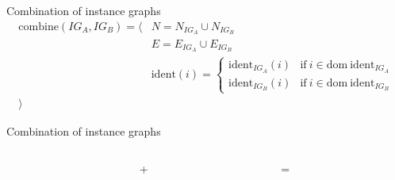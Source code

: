 \begin{frame}{Combination of instance graphs}
\begin{align*}
\mathrm{combine}(IG_A, IG_B) = \langle&
N = N_{IG_A} \cup N_{IG_B} \\&
E = E_{IG_A} \cup E_{IG_B} \\&
\mathrm{ident}(i) =
    \begin{cases}
        \mathrm{ident}_{IG_A}(i) & \mathrm{if }\ i \in \mathrm{dom}\ \mathrm{ident}_{IG_A} \\
        \mathrm{ident}_{IG_B}(i) & \mathrm{if }\ i \in \mathrm{dom}\ \mathrm{ident}_{IG_B} 
    \end{cases}\\ \rangle
\end{align*}
\end{frame}


\begin{frame}{Combination of instance graphs}
    \begin{columns}[c]
        \begin{column}{0.05\textwidth}
        \end{column}\begin{column}{0.25\textwidth}
            \centering
            
        \end{column}\begin{column}{0.05\textwidth}
            \centering
            +
        \end{column}\begin{column}{0.25\textwidth}
            \centering
            
        \end{column}\begin{column}{0.05\textwidth}
            \centering
            =
        \end{column}\begin{column}{0.3\textwidth}
            \centering
            
        \end{column}
    \end{columns}
\end{frame}

